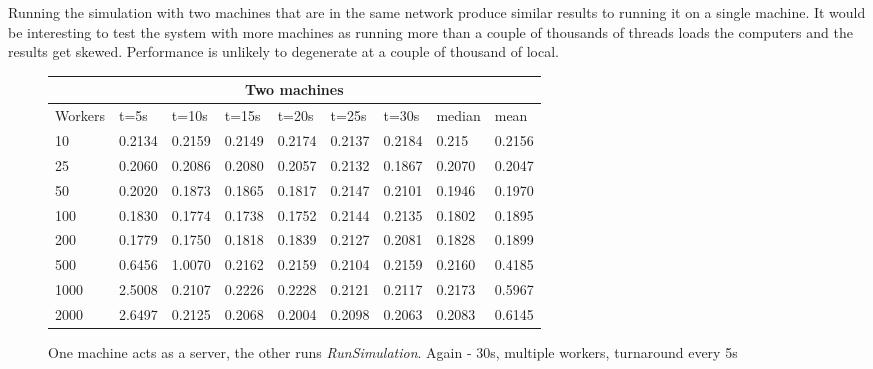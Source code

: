 \documentclass[10pt]{article}
\begin{document}
\pagebreak
Running the simulation with two machines that are in the same network produce similar results to running it on a single machine. It would be interesting to test the system with more machines as running more than a couple of thousands of threads loads the computers and the results get skewed. Performance is unlikely to degenerate at a couple of thousand of local.\par
\begin{figure}[h]
\begin{center}
\begin{tabular}{ |p{1.2cm}||p{1cm}|p{1cm}|p{1cm}|p{1cm}|p{1cm}|p{1cm}||p{1cm}||p{1cm}|  }
 \hline
 \multicolumn{9}{|c|}{Two machines} \\
 \hline
 Workers & t=5s & t=10s & t=15s & t=20s & t=25s & t=30s & median & mean\\
 \hline
10 & 0.2134 & 0.2159 & 0.2149 & 0.2174 & 0.2137 & 0.2184 & 0.215 & 0.2156\\
25 & 0.2060 & 0.2086 & 0.2080 & 0.2057 & 0.2132 & 0.1867 & 0.2070 & 0.2047\\
50 & 0.2020 & 0.1873 & 0.1865 & 0.1817 & 0.2147 & 0.2101 & 0.1946 & 0.1970\\
100 & 0.1830 & 0.1774 & 0.1738 & 0.1752 & 0.2144 & 0.2135 & 0.1802 & 0.1895\\
200 & 0.1779 & 0.1750 & 0.1818 & 0.1839 & 0.2127 & 0.2081 & 0.1828 & 0.1899\\
500 & 0.6456 & 1.0070 & 0.2162 & 0.2159 & 0.2104 & 0.2159 & 0.2160 & 0.4185\\
1000 & 2.5008 & 0.2107 & 0.2226 & 0.2228 & 0.2121 & 0.2117 & 0.2173 & 0.5967\\
2000 & 2.6497 & 0.2125 & 0.2068 & 0.2004 & 0.2098 & 0.2063 & 0.2083 & 0.6145\\
 \hline
\end{tabular}
\end{center}
\caption{One machine acts as a server, the other runs \textit{RunSimulation}. Again - 30s, multiple workers, turnaround every 5s}
\end{figure}
\end{document}
